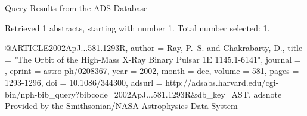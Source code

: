 Query Results from the ADS Database


Retrieved 1 abstracts, starting with number 1.  Total number selected: 1.

@ARTICLE{2002ApJ...581.1293R,
   author = {{Ray}, P.~S. and {Chakrabarty}, D.},
    title = "{The Orbit of the High-Mass X-Ray Binary Pulsar 1E 1145.1-6141}",
  journal = {\apj},
   eprint = {astro-ph/0208367},
     year = 2002,
    month = dec,
   volume = 581,
    pages = {1293-1296},
      doi = {10.1086/344300},
   adsurl = {http://adsabs.harvard.edu/cgi-bin/nph-bib_query?bibcode=2002ApJ...581.1293R&db_key=AST},
  adsnote = {Provided by the Smithsonian/NASA Astrophysics Data System}
}


